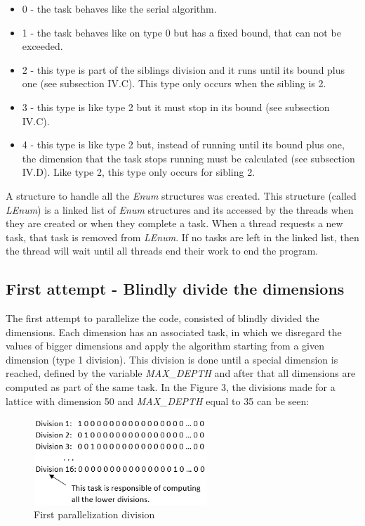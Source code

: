\documentclass[conference]{IEEEtran}
\begin{document}
\begin{itemize}
\item 0 - the task behaves like the serial algorithm.
\item 1 - the task behaves like on type 0 but has a fixed bound, that can not be exceeded.
\item 2 - this type is part of the siblings division and it runs until its bound plus one (see subsection IV.C). This type only occurs when the sibling is 2.
\item 3 - this type is like type 2 but it must stop in its bound (see subsection IV.C).
\item 4 - this type is like type 2 but, instead of running until its bound plus one, the dimension that the task stops running must be calculated (see subsection IV.D). Like type 2, this type only occurs for sibling 2.
\end{itemize}

A structure to handle all the \emph{Enum} structures was created. This structure (called \emph{LEnum}) is a linked list of \emph{Enum} structures and its accessed by the threads when they are created or when they complete a task. When a thread requests a new task, that task is removed from \emph{LEnum}. If no tasks are left in the linked list, then the thread will wait until all threads end their work to end the program.


\subsection{First attempt - Blindly divide the dimensions}
The first attempt to parallelize the code, consisted of blindly divided the dimensions. Each dimension has an associated task, in which we disregard the values of bigger dimensions and apply the algorithm starting from a given dimension (type 1 division). This division is done until a special dimension is reached, defined by the variable \emph{MAX\_DEPTH} and after that all dimensions are computed as part of the same task. 
In the Figure 3, the divisions made for a lattice with dimension 50 and \emph{MAX\_DEPTH} equal to 35 can be seen:

\begin{figure}[ht!]
\centering
\includegraphics[width=65mm]{imgParallel/PrimeiraParalelizacao}
\caption{First parallelization division}
\end{figure}
\end{document}
